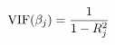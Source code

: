 \documentclass[preview]{standalone}
\begin{document}
\begin{align*}
\special{dvisvgm:raw <g id='unique000'>}\text{VIF}(\beta_j) = \frac{1}{1 - R^2_j}\special{dvisvgm:raw </g>}
\end{align*}
\end{document}
